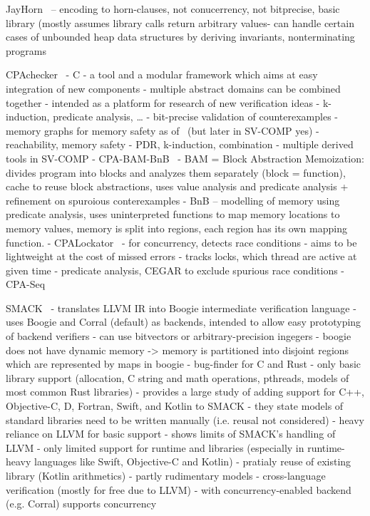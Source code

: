 JayHorn~
-- encoding to horn-clauses, not conucerrency, not bitprecise, basic library (mostly assumes library calls return arbitrary values- can handle certain cases of unbounded heap data structures by deriving invariants, nonterminating programs

CPAchecker~
- C
- a tool and a modular framework which aims at easy integration of new components
- multiple abstract domains can be combined together
- intended as a platform for research of new verification ideas
- k-induction, predicate analysis, …
- bit-precise validation of counterexamples
- memory graphs for memory safety as of~ (but later in SV-COMP yes)
- reachability, memory safety
- PDR, k-induction, combination 
- multiple derived tools in SV-COMP
  - CPA-BAM-BnB~
    - BAM = Block Abstraction Memoization: divides program into blocks and analyzes them separately (block = function), cache to reuse block abstractions, uses value analysis and predicate analysis + refinement on spuroious conterexamples
    - BnB -- modelling of memory using predicate analysis, uses uninterpreted functions to map memory locations to memory values, memory is split into regions, each region has its own mapping function.
  - CPALockator~
    - for concurrency, detects race conditions
    - aims to be lightweight at the cost of missed errors
    - tracks locks, which thread are active at given time
    - predicate analysis, CEGAR to exclude spurious race conditions
  - CPA-Seq

SMACK~
- translates LLVM IR into Boogie intermediate verification language
- uses Boogie and Corral (default) as backends, intended to allow easy prototyping of backend verifiers
- can use bitvectors or arbitrary-precision ingegers
- boogie does not have dynamic memory -> memory is partitioned into disjoint regions which are represented by maps in boogie
- bug-finder for C and Rust
  - only basic library support (allocation, C string and math operations, pthreads, models of most common Rust libraries)
-  provides a large study of adding support for C++, Objective-C, D, Fortran, Swift, and Kotlin to SMACK
  - they state models of standard libraries need to be written manually (i.e. reusal not considered)
  - heavy reliance on LLVM for basic support
  - shows limits of SMACK's handling of LLVM
  - only limited support for runtime and libraries (especially in runtime-heavy languages like Swift, Objective-C and Kotlin)
    - pratialy reuse of existing library (Kotlin arithmetics)
    - partly rudimentary models
  - cross-language verification (mostly for free due to LLVM)
- with concurrency-enabled backend (e.g. Corral) supports concurrency

